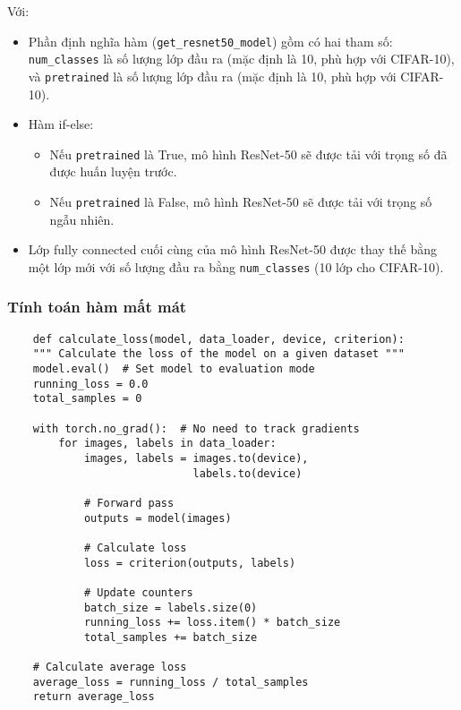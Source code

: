 \documentclass[../main.tex]{subfiles}
\begin{document}
Với:

\begin{itemize}
    \item Phần định nghĩa hàm (\verb|get_resnet50_model|) gồm có hai tham số: \verb|num_classes| là số lượng lớp đầu ra (mặc định là 10, phù hợp với CIFAR-10), và \verb|pretrained| là số lượng lớp đầu ra (mặc định là 10, phù hợp với CIFAR-10).
    \item Hàm if-else:
    \begin{itemize}
        \item Nếu \verb|pretrained| là True, mô hình ResNet-50 sẽ được tải với trọng số đã được huấn luyện trước.
        \item Nếu \verb|pretrained| là False, mô hình ResNet-50 sẽ được tải với trọng số ngẫu nhiên.
    \end{itemize}
    \item Lớp fully connected cuối cùng của mô hình ResNet-50 được thay thế bằng một lớp mới với số lượng đầu ra bằng \verb|num_classes| (10 lớp cho CIFAR-10).
\end{itemize}

\subsubsection*{Tính toán hàm mất mát}

\begin{verbatim}
    def calculate_loss(model, data_loader, device, criterion):
    """ Calculate the loss of the model on a given dataset """
    model.eval()  # Set model to evaluation mode
    running_loss = 0.0
    total_samples = 0
    
    with torch.no_grad():  # No need to track gradients
        for images, labels in data_loader:
            images, labels = images.to(device), 
                             labels.to(device)
            
            # Forward pass
            outputs = model(images)
            
            # Calculate loss
            loss = criterion(outputs, labels)
            
            # Update counters
            batch_size = labels.size(0)
            running_loss += loss.item() * batch_size
            total_samples += batch_size
    
    # Calculate average loss
    average_loss = running_loss / total_samples
    return average_loss
\end{verbatim}
\end{document}

